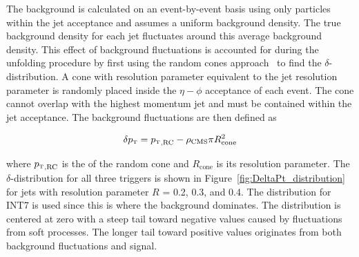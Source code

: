 \noindent
The background is calculated on an event-by-event basis using only particles within the jet acceptance and assumes a uniform background density. The true background density for each jet fluctuates around this average background density. This effect of background fluctuations is accounted for during the unfolding procedure by first using the random cones approach~\cite{ALICE:2012nbx} to find the $\delta$-\pT distribution. A cone with resolution parameter equivalent to the jet resolution parameter is randomly placed inside the $\eta-\phi$ acceptance of each event. The cone cannot overlap with the highest momentum jet and must be contained within the jet acceptance. The background fluctuations are then defined as 

\begin{equation}
    \delta \text{$p_{\mbox{\tiny T}}$} = \text{$p_{\mbox{\tiny T}}$}_\text{,RC} - \rho_{\text{CMS}} \pi R_{\text{cone}}^2
\end{equation}

\noindent
where $\text{$p_{\mbox{\tiny T}}$}_\text{,RC}$ is the \pT of the random cone and $R_{\text{cone}}$ is its resolution parameter. The $\delta$-\pT distribution for all three triggers is shown in Figure~\ref{fig:DeltaPt_distribution} for jets with resolution parameter $R$ = 0.2, 0.3, and 0.4. The distribution for INT7 is used since this is where the background dominates. The distribution is centered at zero with a steep tail toward negative values caused by fluctuations from soft processes. The longer tail toward positive values originates from both background fluctuations and signal.

